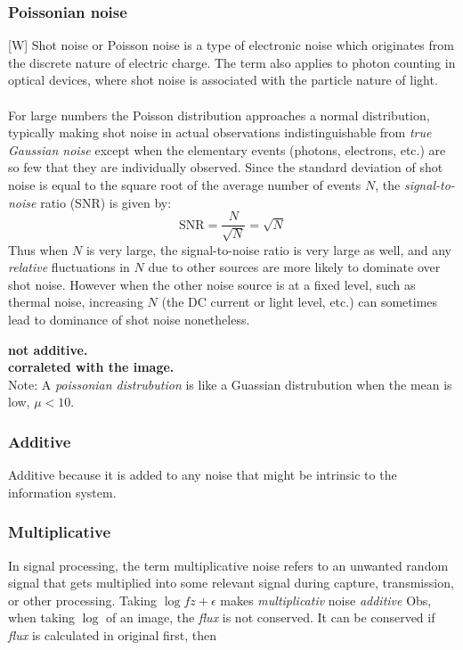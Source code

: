 \documentclass[12pt]{article}
\begin{document}
	\subsubsection{Poissonian noise}
	[W] Shot noise or Poisson noise is a type of electronic noise which originates from the 
	discrete nature of electric charge. The term also applies to photon counting in optical 
	devices, where shot noise is associated with the particle nature of light.\\
	\\
	For large numbers the Poisson distribution approaches a normal distribution, typically 
	making shot noise in actual observations indistinguishable from \emph{true Gaussian noise} 
	except when the elementary events (photons, electrons, etc.) are so few that they are 
	individually observed. Since the standard deviation of shot noise is equal to the square 
	root of the average number of events $N$, the \emph{signal-to-noise} ratio (SNR) is given by:
    $$
    \mathrm{SNR} = \frac{N}{\sqrt{N}} = \sqrt{N}
    $$
    Thus when $N$ is very large, the signal-to-noise ratio is very large as well, and any 
    \emph{relative} fluctuations in $N$ due to other sources are more likely to dominate over 
    shot noise. However when the other noise source is at a fixed level, such as thermal noise, 
    increasing $N$ (the DC current or light level, etc.) can sometimes lead to dominance of 
    shot noise nonetheless.
    
    \textbf{not additive.} \\
	\textbf{corraleted with the image.} \\
	
	Note: A \textit{poissonian distrubution} is like a Guassian distrubution when the mean is low, $\mu < 10$.
	
	\subsubsection{Additive}
    
    Additive because it is added to any noise that might be intrinsic to the information system.
	
	\subsubsection{Multiplicative}
	In signal processing, the term multiplicative noise refers to an unwanted random signal that 
	gets multiplied into some relevant signal during capture, transmission, or other processing.
	Taking $\log{f{z} + \epsilon}$ makes \textit{multiplicativ} noise \textit{additive}
	Obs, when taking $\log$ of an image, the \textit{flux} is not conserved. It can be conserved if \textit{flux} is calculated in original first, then
	
\end{document}
